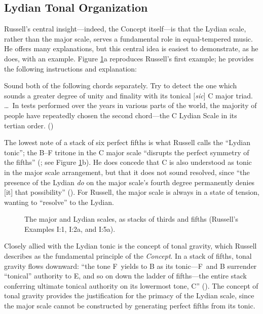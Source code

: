 \subsection{Lydian Tonal Organization}
\label{subsec:lydian-org}

Russell's central insight---indeed, the Concept itself---is that the Lydian
scale, rather than the major scale, serves a fundamental role in
equal-tempered music. He offers many explanations, but this central idea is
easiest to demonstrate, as he does, with an example. Figure
\ref{lcc:tertian-stacks}a reproduces Russell's first example; he provides the
following instructions and explanation:%
%
\begin{quoting}
  \singlespacing
  Sound both of the following chords separately. Try to detect the one which
  sounds a greater degree of unity and finality with its tonical [\emph{sic}] C
  major triad. \ldots\ In tests performed over the years in various parts of the
  world, the majority of people have repeatedly chosen the second chord---the C
  Lydian Scale in its tertian order. ()
\end{quoting}%
%
The lowest note of a stack of six perfect fifths is what Russell calls the
``Lydian tonic''; the B--F tritone in the C major scale ``disrupts the perfect
symmetry of the fifths'' (; see Figure \ref{lcc:tertian-stacks}b). He
does concede that C is also understood as tonic in the major scale
arrangement, but that it does not sound resolved, since ``the presence of the
Lydian \emph{do} on the major scale's fourth degree permanently denies [it]
that possibility'' (). For Russell, the major scale is always in a state
of tension, wanting to ``resolve'' to the Lydian.

\begin{figure}[tbp]
  \caption[The major and Lydian scales as stacks of thirds and fifths.]{%
    The major and Lydian scales, as stacks of thirds and fifths (Russell's
    Examples I:1, I:2a, and I:5a).}
  \label{lcc:tertian-stacks}
\end{figure}

Closely allied with the Lydian tonic is the concept of tonal gravity, which
Russell describes as the fundamental principle of the \emph{Concept}. In a stack of
fifths, tonal gravity flows downward: ``the tone F\sharp\ yields to B as its
tonic---F\sharp\ and B surrender ``tonical'' authority to E, and so on down the
ladder of fifths---the entire stack conferring ultimate tonical authority on
its lowermost tone, C'' ().  The concept of tonal gravity provides the
justification for the primacy of the Lydian scale, since the major scale
cannot be constructed by generating perfect fifths from its tonic.

